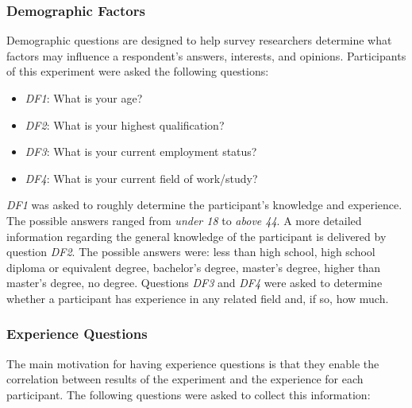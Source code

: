 \subsubsection*{Demographic Factors}
Demographic questions are designed to help survey researchers determine what factors may influence a respondent's answers, interests, and opinions. Participants of this experiment were asked the following questions:

\begin{itemize}
    \item \textit{DF1}: What is your age?
    \item \textit{DF2}: What is your highest qualification?
    \item \textit{DF3}: What is your current employment status?
    \item \textit{DF4}: What is your current field of work/study?
\end{itemize}
\textit{DF1} was asked to roughly determine the participant's knowledge and experience. The possible answers ranged from \textit{under 18} to \textit{above 44}. A more detailed information regarding the general knowledge of the participant is delivered by question \textit{DF2}. The possible answers were: less than high school, high school diploma or equivalent degree, bachelor's degree, master's degree, higher than master's degree, no degree. Questions \textit{DF3} and \textit{DF4} were asked to determine whether a participant has experience in any related field and, if so, how much.

\subsubsection*{Experience Questions}
The main motivation for having experience questions is that they enable the correlation between results of the experiment and the experience for each participant. The following questions were asked to collect this information:

